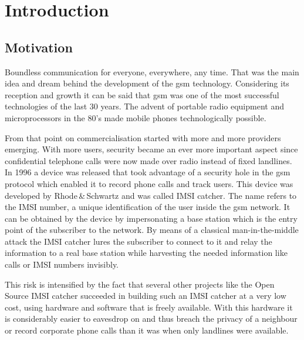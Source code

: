 \chapter{Introduction}

\section{Motivation}
Boundless communication for everyone, everywhere, any time.
That was the main idea and dream behind the development of the \gls{gsm} technology.
Considering its reception and growth \cite{GSM2009,GSM_history2011,GSM_stats2011} it can be said that \gls{gsm} was one of the most successful technologies of the last 30 years.
The advent of portable radio equipment and microprocessors in the 80's made mobile phones technologically possible.

From that point on commercialisation started with more and more providers emerging.
With more users, security became an ever more important aspect since confidential telephone calls were now made over radio instead of fixed landlines.
In 1996 a device was released that took advantage of a security hole in the \gls{gsm} protocol which enabled it to record phone calls and track users.
This device was developed by Rhode\,\&\,Schwartz and was called IMSI catcher.
The name refers to the IMSI number, a unique identification of the user inside the \gls{gsm} network.
It can be obtained by the device by impersonating a base station which is the entry point of the subscriber to the network.
By means of a classical man-in-the-middle attack the IMSI catcher lures the subscriber to connect to it and relay the information to a real base station while harvesting the needed information like calls or IMSI numbers invisibly.

This risk is intensified by the fact that several other projects like the Open Source IMSI catcher \cite{dennis} succeeded in building such an IMSI catcher at a very low cost, using hardware and software that is freely available.
With this hardware it is considerably easier to eavesdrop on and thus breach the privacy of a neighbour or record corporate phone calls than it was when only landlines were available.

